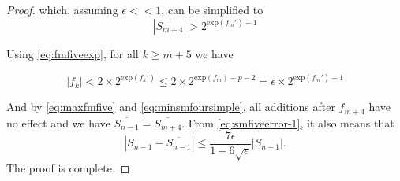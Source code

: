 \documentclass[12pt]{article}
\providecommand{\exp}{\ensuremath{\text{exp}}}
\theoremstyle{definition}
\numberwithin{equation}{section}
\numberwithin{figure}{section}
\begin{document}
\begin{proof}
        which, assuming $\epsilon << 1$, can be simplified to
        \begin{equation}
          |\overline{S_{m + 4}}| > 2^{\exp(f_m') - 1}
          \label{eq:minsmfoursimple}
        \end{equation}

        Using  \eqref{eq:fmfiveexp}, for all $k \geq m + 5$ we have

        \begin{equation}
          |f_k| < 2 \times 2^{\exp(f_k')} \leq 2 \times 2^{\exp(f_m) - p - 2} = \epsilon \times 2^{\exp(f_m') - 1}
          \label{eq:maxfmfive}
        \end{equation}

    And by \eqref{eq:maxfmfive} and \eqref{eq:minsmfoursimple}, all additions after $f_{m + 4}$ have no effect and we have $\overline{S_{n-1}} = \overline{S_{m+4}}$.
    From \eqref{eq:smfiveerror-1}, it also means that
        \[
         |S_{n-1} - \overline{S_{n-1}}| \leq \frac{7\epsilon}{1-6\sqrt{\epsilon}} |S_{n-1}|.
        \]
    The proof is complete.

    \end{proof}
\end{document}
